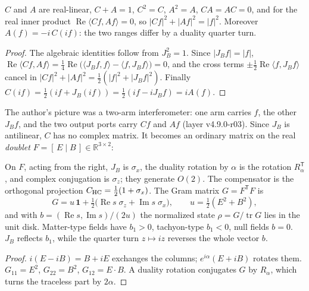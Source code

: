 \begin{proposition}\label{prop:ports}
\(C\) and \(A\) are real-linear, \(C+A=1\), \(C^2=C\), \(A^2=A\), \(CA=AC=0\), and for the real inner product
\(\operatorname{Re}\langle Cf,Af\rangle=0\), so \(|Cf|^2+|Af|^2=|f|^2\).  Moreover \(A(f)=-i\,C(if)\): the two ranges differ by
a duality quarter turn.
\end{proposition}

\begin{proof}
The algebraic identities follow from \(J_B^2=1\).  Since \(|J_Bf|=|f|\),
\(\operatorname{Re}\langle Cf,Af\rangle=\tfrac14\operatorname{Re}\bigl(\langle J_Bf,f\rangle-\langle f,J_Bf\rangle\bigr)=0\), and the
cross terms \(\pm\tfrac12\operatorname{Re}\langle f,J_Bf\rangle\) cancel in \(|Cf|^2+|Af|^2=\tfrac12(|f|^2+|J_Bf|^2)\).
Finally \(C(if)=\tfrac12(if+J_B(if))=\tfrac12(if-iJ_Bf)=iA(f)\).
\end{proof}

The author's picture was a two-arm interferometer: one arm carries \(f\), the other \(J_Bf\), and the two output ports carry
\(Cf\) and \(Af\) (layer v4.9.0-r03).  Since \(J_B\) is antilinear, \(C\) has no complex matrix.  It becomes an ordinary
matrix on the real \emph{doublet} \(F=[\,E\mid B\,]\in\mathbb R^{3\times2}\):

\begin{proposition}\label{prop:doublet}
On \(F\), acting from the right, \(J_B\) is \(\sigma_x\), the duality rotation by \(\alpha\) is the rotation \(R_\alpha^{\mathsf T}\),
and complex conjugation is \(\sigma_z\); they generate \(O(2)\).  The compensator is the orthogonal projection
\(C_{\rm HC}=\tfrac12(1+\sigma_x)\).  The Gram matrix \(G=F^{\mathsf T}F\) is
\[
G=u\,\mathbf 1+\tfrac12\bigl(\operatorname{Re}s\;\sigma_z+\operatorname{Im}s\;\sigma_x\bigr),\qquad
u=\tfrac12(E^2+B^2),
\]
and with \(b=(\operatorname{Re}s,\operatorname{Im}s)/(2u)\) the normalized state \(\rho=G/\operatorname{tr}G\) lies in the unit disk.
Matter-type fields have \(b_1>0\), tachyon-type \(b_1<0\), null fields \(b=0\).  \(J_B\) reflects \(b_1\), while the quarter
turn \(z\mapsto iz\) reverses the whole vector \(b\).
\end{proposition}

\begin{proof}
\(i(E-iB)=B+iE\) exchanges the columns; \(e^{i\alpha}(E+iB)\) rotates them.  \(G_{11}=E^2\), \(G_{22}=B^2\),
\(G_{12}=E\cdot B\).  A duality rotation conjugates \(G\) by \(R_\alpha\), which turns the traceless part by \(2\alpha\).
\end{proof}


